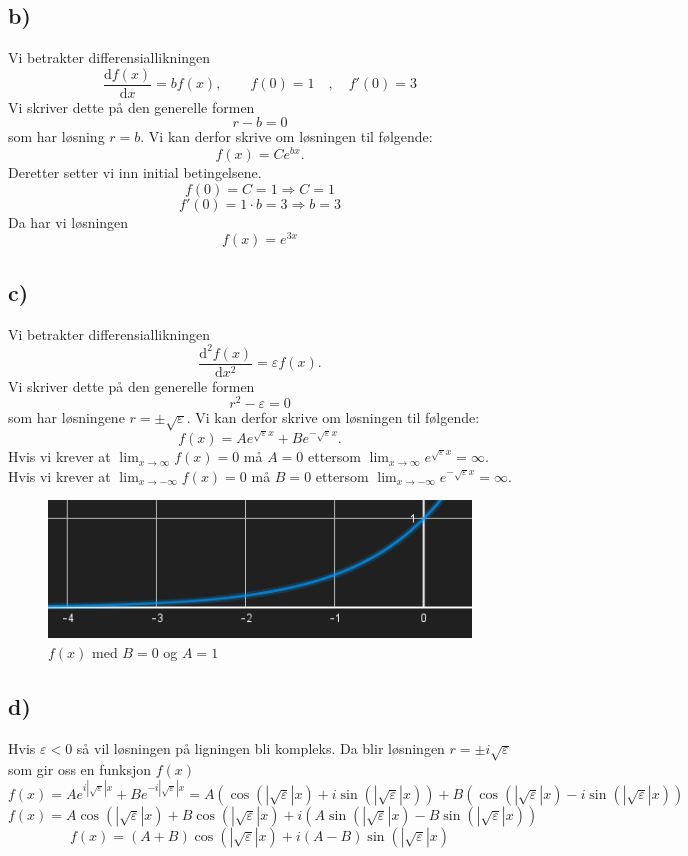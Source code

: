 \documentclass{article}
\begin{document}
\subsection*{b)}
Vi betrakter differensiallikningen 
\[
\frac{\mathrm{d}f(x)}{\mathrm{d}x} = b f(x), \qquad f(0) = 1 \quad , \quad f'(0) = 3
\]
Vi skriver dette på den generelle formen 
\[
r - b = 0
\]
som har løsning $r = b$. Vi kan derfor skrive om løsningen til følgende: 
\[
f(x) = Ce^{bx}. 
\]
Deretter setter vi inn initial betingelsene. 
\[
f(0) = C = 1 ⇒ C = 1
\]
\[
f'(0) = 1 ⋅ b = 3 ⇒ b = 3
\]
Da har vi løsningen
\[
f(x) = e^{3x}
\]
\subsection*{c)}
Vi betrakter differensiallikningen 
\[
\frac{\mathrm{d}^{2}f(x)}{\mathrm{d}x^{2}} = ε f(x) .
\]
Vi skriver dette på den generelle formen
\[
r^{2} - ε = 0
\]
som har løsningene $r = ±  \sqrt{ε}$. Vi kan derfor skrive om løsningen til følgende:
\[
f(x) = A e^{\sqrt{ε}x} + B e^{-\sqrt{ε}x}.
\]
Hvis vi krever at $\lim_{x \to ∞} f(x) = 0$ må $A = 0$ ettersom $\lim_{x \to ∞}e ^{\sqrt{ε}x} = ∞$. \\ 

Hvis vi krever at $\lim_{x \to -∞}f(x) = 0$ må $B = 0$ ettersom $\lim_{x \to -∞}e ^{-\sqrt{ε}x} = ∞$. \\

\begin{figure}[h!]
  \centering
  \includegraphics[scale = .75]{Figures/B.4.d.png}
  \caption{$f(x)$ med $B = 0$ og $A = 1$}
  \label{fig: B.4.d}
\end{figure}

\subsection*{d)}
Hvis $ε < 0$ så vil løsningen på ligningen bli kompleks. Da blir løsningen $r = ± i \sqrt{ε}$ som gir oss en funksjon $f(x)$    
\[
 f(x) = A e^{i \left|\sqrt{ε}\right| x} + B e^{-i \left|\sqrt{ε}\right| x} = A( \cos (\left|\sqrt{ε}\right| x) + i \sin (\left|\sqrt{ε}\right| x) ) + B( \cos (\left|\sqrt{ε}\right| x) - i \sin (\left|\sqrt{ε}\right| x) )
\]
\[
f(x) =  A \cos (\left|\sqrt{ε}\right| x) + B \cos (\left|\sqrt{ε}\right| x) + i\left( A \sin (\left|\sqrt{ε}\right| x) - B \sin (\left|\sqrt{ε}\right| x) \right)
\]
\[
f(x) = \left( A + B \right) \cos (\left|\sqrt{ε}\right| x) + i \left( A - B \right) \sin (\left|\sqrt{ε}\right| x)
\]
\end{document}
